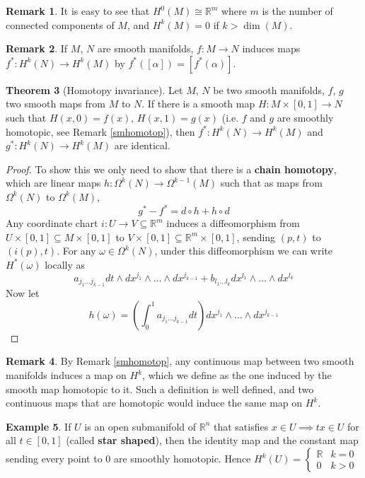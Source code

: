 \documentclass{article}
\theoremstyle{definition}
\newtheorem{thm}{Theorem}[section]
\newtheorem{rmk}[thm]{Remark}
\newtheorem{exm}[thm]{Example}
\begin{document}
    \begin{rmk}
        It is easy to see that $H^0(M)\cong\mathbb{R}^m$ where $m$ is the number of connected components of $M$, and $H^k(M)=0$ if $k>\dim(M)$.
    \end{rmk}
    
    \begin{rmk}
        If $M$, $N$ are smooth manifolds, $f: M\rightarrow N$ induces maps $f^*: H^k(N)\rightarrow H^k(M)$ by $f^*([\alpha])=[f^*(\alpha)]$.  \end{rmk}
\begin{thm}[Homotopy invariance]
    Let $M$, $N$ be two smooth manifolds, $f$, $g$ two smooth maps from $M$ to $N$. If there is a smooth map $H: M\times [0, 1]\rightarrow N$ such that $H(x, 0)=f(x)$, $H(x, 1)=g(x)$ (i.e. $f$ and $g$ are smoothly homotopic, see Remark \ref{smhomotop}), then $f^*: H^k(N)\rightarrow H^k(M)$ and $g^*: H^k(N)\rightarrow H^k(M)$ are identical.
\end{thm}

\begin{proof}
    To show this we only need to show that there is a {\bf chain homotopy}, which are linear maps $h: \Omega^k(N)\rightarrow \Omega^{k-1}(M)$ such that as maps from $\Omega^k(N)$ to $\Omega^k(M)$, 
    \[g^*-f^*=d\circ h+h\circ d\]
    Any coordinate chart $i: U\rightarrow V\subseteq \mathbb{R}^m$ induces a diffeomorphism from $U\times [0, 1]\subseteq M\times [0, 1]$ to $V\times [0, 1]\subseteq \mathbb{R}^m\times [0, 1]$, sending $(p, t)$ to $(i(p), t)$. For any $\omega\in \Omega^k(N)$, under this diffeomorphism we can write $H^*(\omega)$ locally as
    \[a_{j_1\dots j_{k-1}}dt\wedge dx^{j_1}\wedge\dots\wedge dx^{j_{k-1}}+b_{l_1\dots l_k}dx^{l_1}\wedge\dots \wedge dx^{l_k}\]
    Now let
    \[h(\omega)=(\int_0^1 a_{j_1\dots j_{k-1}}dt)dx^{j_1}\wedge\dots\wedge dx^{j_{k-1}}\]
\end{proof}

\begin{rmk}
    By Remark \ref{smhomotop}, any continuous map between two smooth manifolds induces a map on $H^k$, which we define as the one induced by the smooth map homotopic to it. Such a definition is well defined, and two continuous maps that are homotopic would induce the same map on $H^k$.
\end{rmk}

\begin{exm}\label{star}
    If $U$ is an open submanifold of $\mathbb{R}^n$ that satisfies $x\in U\implies tx\in U$ for all $t\in [0, 1]$ (called {\bf star shaped}), then the identity map and the constant map sending every point to $0$ are smoothly homotopic. Hence $H^k(U)=\begin{cases}
        \mathbb{R} & k=0\\
        0 & k>0
    \end{cases}$
\end{exm}
\end{document}
